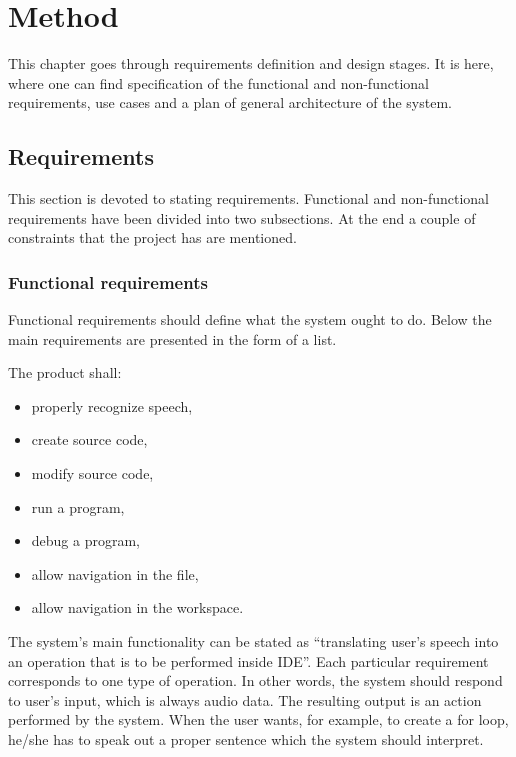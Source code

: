 \chapter{Method}
\label{cha:Method}


This chapter goes through requirements definition and design stages. It is here, where one can find specification of the functional and non-functional requirements, use cases and a plan of general architecture of the system. 

\section{Requirements}

This section is devoted to stating requirements. Functional and non-functional requirements have been divided into two subsections. At the end a couple of constraints that the project has are mentioned.

\subsection{Functional requirements}
Functional requirements should define what the system ought to do. Below the main requirements are presented in the form of a list. 

The product shall:
\begin{itemize}
  \item properly recognize speech,
  \item create source code,
  \item modify source code,
  \item run a program,
  \item debug a program,
  \item allow navigation in the file,
  \item allow navigation in the workspace.
\end{itemize}

The system's main functionality can be stated as ``translating user's speech into an operation that is to be performed inside IDE''. Each particular requirement corresponds to one type of operation. In other words, the system should respond to user's input, which is always audio data. The resulting output is an action performed by the system. When the user wants, for example, to create a for loop, he/she has to speak out a proper sentence which the system should interpret. 

